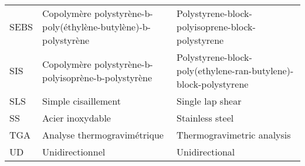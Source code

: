 \begin{longtable}{p{0.75in}>{\raggedright\arraybackslash}p{2.5in} p{2.5in}}
	SEBS  & Copolymère polystyrène-b-poly(éthylène-butylène)-b-polystyrène & Polystyrene-block-polyisoprene-block-polystyrene                \\
	SIS   & Copolymère polystyrène-b-polyisoprène-b-polystyrène            & Polystyrene-block-poly(ethylene-ran-butylene)-block-polystyrene \\
	SLS   & Simple cisaillement                                            & Single lap shear                                                \\
	SS    & Acier inoxydable                                               & Stainless steel                                                 \\
	TGA   & Analyse thermogravimétrique                                    & Thermogravimetric analysis                                      \\
	UD    & Unidirectionnel                                                & Unidirectional
\end{longtable}

